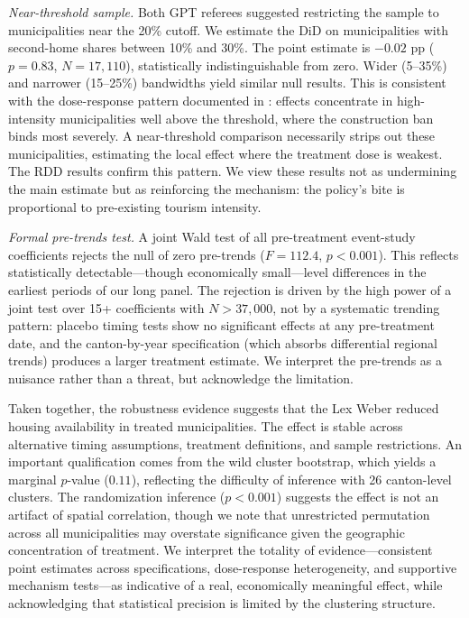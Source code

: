 \documentclass[12pt]{article}
\begin{document}
\textit{Near-threshold sample.} Both GPT referees suggested restricting the sample to municipalities near the 20\% cutoff. We estimate the DiD on municipalities with second-home shares between 10\% and 30\%. The point estimate is $-0.02$ pp ($p = 0.83$, $N = 17{,}110$), statistically indistinguishable from zero. Wider (5--35\%) and narrower (15--25\%) bandwidths yield similar null results. This is consistent with the dose-response pattern documented in : effects concentrate in high-intensity municipalities well above the threshold, where the construction ban binds most severely. A near-threshold comparison necessarily strips out these municipalities, estimating the local effect where the treatment dose is weakest. The RDD results confirm this pattern. We view these results not as undermining the main estimate but as reinforcing the mechanism: the policy's bite is proportional to pre-existing tourism intensity.

\textit{Formal pre-trends test.} A joint Wald test of all pre-treatment event-study coefficients rejects the null of zero pre-trends ($F = 112.4$, $p < 0.001$). This reflects statistically detectable---though economically small---level differences in the earliest periods of our long panel. The rejection is driven by the high power of a joint test over 15+ coefficients with $N > 37{,}000$, not by a systematic trending pattern: placebo timing tests show no significant effects at any pre-treatment date, and the canton-by-year specification (which absorbs differential regional trends) produces a larger treatment estimate. We interpret the pre-trends as a nuisance rather than a threat, but acknowledge the limitation.

Taken together, the robustness evidence suggests that the Lex Weber reduced housing availability in treated municipalities. The effect is stable across alternative timing assumptions, treatment definitions, and sample restrictions. An important qualification comes from the wild cluster bootstrap, which yields a marginal $p$-value ($0.11$), reflecting the difficulty of inference with 26 canton-level clusters. The randomization inference ($p < 0.001$) suggests the effect is not an artifact of spatial correlation, though we note that unrestricted permutation across all municipalities may overstate significance given the geographic concentration of treatment. We interpret the totality of evidence---consistent point estimates across specifications, dose-response heterogeneity, and supportive mechanism tests---as indicative of a real, economically meaningful effect, while acknowledging that statistical precision is limited by the clustering structure.
\end{document}
